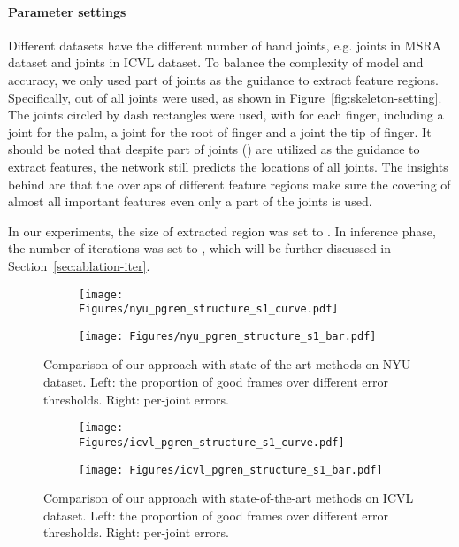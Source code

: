 \documentclass[final, 5p]{elsarticle}
\begin{document}
\paragraph{\textbf{Parameter settings}} Different datasets have the different number of hand joints, e.g.  joints in MSRA dataset and  joints in ICVL dataset. To balance the complexity of model and accuracy, we only used part of joints as the guidance to extract feature regions. Specifically,  out of all joints were used, as shown in Figure~\ref{fig:skeleton-setting}. The joints circled by dash rectangles were used, with  for each finger, including a joint for the palm, a joint for the root of finger and a joint the tip of finger. It should be noted that despite part of joints () are utilized as the guidance to extract features, the network still predicts the locations of all joints. The insights behind are that the overlaps of different feature regions make sure the covering of almost all important features even only a part of the joints is used.

In our experiments, the size of extracted region was set to . In inference phase, the number of iterations was set to , which will be further discussed in Section~\ref{sec:ablation-iter}.

\begin{figure*}[!tb]
  \centering
  \begin{subfigure}[t]{0.5\textwidth}
    \centering
    \centerline{\texttt{[image: Figures/nyu\_pgren\_structure\_s1\_curve.pdf]}}
  \end{subfigure}\begin{subfigure}[t]{0.5\textwidth}
    \centering
    \centerline{\texttt{[image: Figures/nyu\_pgren\_structure\_s1\_bar.pdf]}}
  \end{subfigure}\caption{Comparison of our approach with state-of-the-art methods on NYU dataset. Left: the proportion of good frames
over different error thresholds. Right: per-joint errors.}
\label{fig:nyu-results}
\end{figure*}

\begin{figure*}[!tb]
  \centering
  \begin{subfigure}[t]{0.5\textwidth}
    \centering
    \centerline{\texttt{[image: Figures/icvl\_pgren\_structure\_s1\_curve.pdf]}}
  \end{subfigure}\begin{subfigure}[t]{0.5\textwidth}
    \centering
    \centerline{\texttt{[image: Figures/icvl\_pgren\_structure\_s1\_bar.pdf]}}
  \end{subfigure}\caption{Comparison of our approach with state-of-the-art methods on ICVL dataset.  Left: the proportion of good frames over different error thresholds. Right: per-joint errors.}
\label{fig:icvl-results}
\end{figure*}
\end{document}
